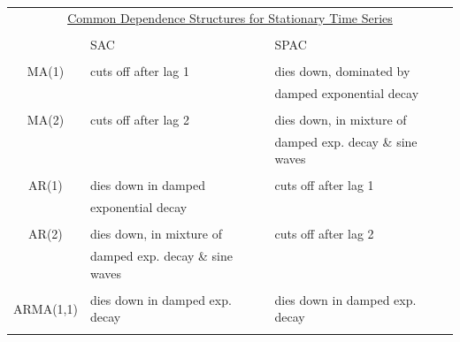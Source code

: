 \documentclass[12pt]{notes}
\begin{document}
\begin{enumerate}[leftmargin=*]
\begin{itemize}
\end{itemize}

\vspace{1em}


\begin{tabular}{c l l}
\multicolumn{3}{c}{\underline{Common Dependence Structures for Stationary Time Series}} \\
& & \\
  & SAC & SPAC \\ \hline
 & \\
MA(1) & cuts off after lag 1 & dies down, dominated by\\
  & & damped exponential decay \\
 & \\
MA(2) & cuts off after lag 2 & dies down, in mixture of\\
  & & damped exp. decay \& sine waves \\
 & \\
AR(1) & dies down in damped & cuts off after lag 1\\
  & exponential decay & \\
 & \\
AR(2) & dies down, in mixture of & cuts off after lag 2\\
 & damped exp. decay \& sine waves & \\
 & \\
ARMA(1,1) & dies down in damped exp. decay & dies down in damped exp. decay\\
 & \\ \hline
\end{tabular}

\vspace{3em}


\end{enumerate}
\end{document}
